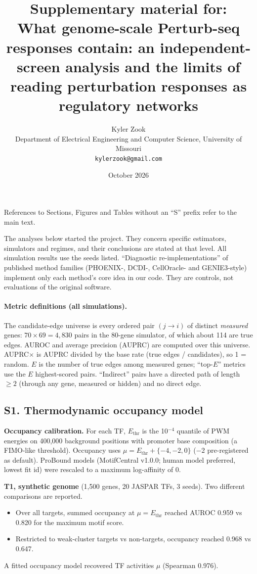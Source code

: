 \documentclass[10pt]{article}
\title{\vspace{-1.2em}\textbf{Supplementary material for:}\\[2pt]\large What genome-scale Perturb-seq responses contain: an independent-screen analysis and the limits of reading perturbation responses as regulatory networks}
\author{Kyler Zook\\\small Department of Electrical Engineering and Computer Science, University of Missouri\\\small\texttt{kylerzook@gmail.com}}
\date{\small October 2026}
\renewcommand{\thetable}{\arabic{table}}
\begin{document}
\maketitle
\noindent References to Sections, Figures and Tables without an ``S'' prefix refer to the main text.

\renewcommand{\thetable}{S\arabic{table}}
\renewcommand{\thefigure}{S\arabic{figure}}
\setcounter{table}{0}\setcounter{figure}{0}

The analyses below started the project. They concern specific estimators, simulators and regimes, and their conclusions are stated at that level. All simulation results use the seeds listed. ``Diagnostic re-implementations'' of published method families (PHOENIX-, DCDI-, CellOracle- and GENIE3-style) implement only each method's core idea in our code. They are controls, not evaluations of the original software.

\paragraph{Metric definitions (all simulations).} The candidate-edge universe is every ordered pair $(j\to i)$ of distinct \emph{measured} genes: $70\times69=4{,}830$ pairs in the 80-gene simulator, of which about 114 are true edges. AUROC and average precision (AUPRC) are computed over this universe. AUPRC$\times$ is AUPRC divided by the base rate (true edges / candidates), so 1 = random. $E$ is the number of true edges among measured genes; ``top-$E$'' metrics use the $E$ highest-scored pairs. ``Indirect'' pairs have a directed path of length $\ge2$ (through any gene, measured or hidden) and no direct edge.

\subsection*{S1. Thermodynamic occupancy model}
\textbf{Occupancy calibration.} For each TF, $E_\text{thr}$ is the 10$^{-4}$ quantile of PWM energies on 400{,}000 background positions with promoter base composition (a FIMO-like threshold). Occupancy uses $\mu=E_\text{thr}+\{-4,-2,0\}$ ($-2$ pre-registered as default). ProBound models (MotifCentral v1.0.0; human model preferred, lowest fit id) were rescaled to a maximum log-affinity of 0.

\textbf{T1, synthetic genome} (1{,}500 genes, 20 JASPAR TFs, 3 seeds). Two different comparisons are reported.
\begin{itemize}
\item Over all targets, summed occupancy at $\mu=E_\text{thr}$ reached AUROC 0.959 vs 0.820 for the maximum motif score.
\item Restricted to weak-cluster targets vs non-targets, occupancy reached 0.968 vs 0.647.
\end{itemize}
A fitted occupancy model recovered TF activities $\mu$ (Spearman 0.976).
\end{document}
